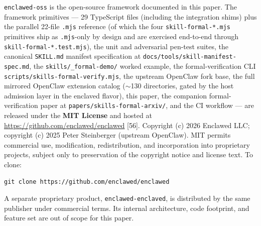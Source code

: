 \documentclass[11pt]{article}
\begin{document}
\texttt{enclawed-oss} is the open-source framework documented in this
paper. The framework primitives --- 29 TypeScript files (including the
integration shims) plus the parallel 22-file \texttt{.mjs} reference
(of which the four \texttt{skill-formal-*.mjs} primitives ship as
\texttt{.mjs}-only by design and are exercised end-to-end through
\texttt{skill-formal-*.test.mjs}), the unit and adversarial
pen-test suites, the canonical \texttt{SKILL.md} manifest specification
at \texttt{docs/tools/skill-manifest-spec.md}, the
\texttt{skills/\_formal-demo/} worked example, the formal-verification
CLI \texttt{scripts/skills-formal-verify.mjs}, the upstream OpenClaw
fork base, the full mirrored OpenClaw extension catalog (\(\sim\)130
directories, gated by the host admission layer in the enclaved flavor),
this paper, the companion formal-verification paper at
\texttt{papers/skills-formal-arxiv/}, and the CI workflow --- are
released under the \textbf{MIT License} and hosted at
\url{https://github.com/enclawed/enclawed} [56]. Copyright (c)
2026 Enclawed LLC; copyright (c) 2025 Peter Steinberger
(upstream OpenClaw). MIT permits commercial use, modification,
redistribution, and incorporation into proprietary projects, subject
only to preservation of the copyright notice and license text. To
clone:
\begin{verbatim}
git clone https://github.com/enclawed/enclawed
\end{verbatim}

A separate proprietary product, \texttt{enclawed-enclaved}, is
distributed by the same publisher under commercial terms. Its
internal architecture, code footprint, and feature set are out of
scope for this paper.
\end{document}
